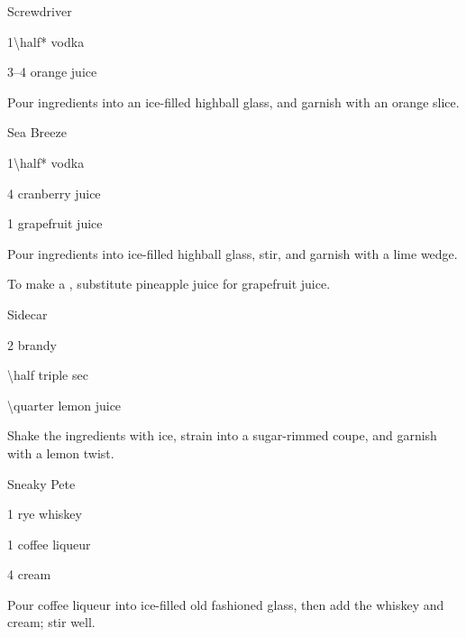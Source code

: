 \begin{Cocktail}{Screwdriver}
  \begin{Ingredients}
  \item \SI{1\half*}{\oz} vodka
  \item \SIrange{3}{4}{\oz} orange juice
  \end{Ingredients}
  
  \begin{Instructions}
	Pour ingredients into an ice-filled highball glass, and garnish with an orange slice.
  \end{Instructions}
\end{Cocktail}

\begin{Cocktail}{Sea Breeze}
  \begin{Ingredients}
  \item \SI{1\half*}{\oz} vodka
  \item \SI{4}{\oz} cranberry juice
  \item \SI{1}{\oz} grapefruit juice
  \end{Ingredients}
  
  \begin{Instructions}
	Pour ingredients into ice-filled highball glass, stir, and garnish with a lime wedge.
	
	To make a , substitute pineapple juice for grapefruit juice.
  \end{Instructions}
\end{Cocktail}

\begin{Cocktail}{Sidecar}
  \begin{Ingredients}
  \item \SI{2}{\oz} brandy
  \item \SI{\half}{\oz} triple sec
  \item \SI{\quarter}{\oz} lemon juice
  \end{Ingredients}
  
  \begin{Instructions}
	Shake the ingredients with ice, strain into a sugar-rimmed coupe, and garnish with a lemon twist.
  \end{Instructions}
\end{Cocktail}

\begin{Cocktail}{Sneaky Pete}
  \begin{Ingredients}
  \item \SI{1}{\oz} rye whiskey
  \item \SI{1}{\oz} coffee liqueur
  \item \SI{4}{\oz} cream
  \end{Ingredients}
  
  \begin{Instructions}
	Pour coffee liqueur into ice-filled old fashioned glass, then add the whiskey and cream; stir well.
  \end{Instructions}
\end{Cocktail}

